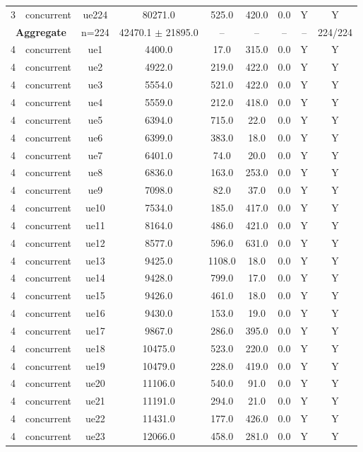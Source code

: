 \begin{table}[ht]
\begin{tabular}{|c|c|c|c|c|c|c|c|c|}
3 & concurrent & ue224 & 80271.0 & 525.0 & 420.0 & 0.0 & Y & Y \\
\multicolumn{2}{|c|}{\textbf{Aggregate}} & n=224 & 42470.1 $\pm$ 21895.0 & -- & -- & -- & -- & 224/224 \\
\hline
4 & concurrent & ue1 & 4400.0 & 17.0 & 315.0 & 0.0 & Y & Y \\
4 & concurrent & ue2 & 4922.0 & 219.0 & 422.0 & 0.0 & Y & Y \\
4 & concurrent & ue3 & 5554.0 & 521.0 & 422.0 & 0.0 & Y & Y \\
4 & concurrent & ue4 & 5559.0 & 212.0 & 418.0 & 0.0 & Y & Y \\
4 & concurrent & ue5 & 6394.0 & 715.0 & 22.0 & 0.0 & Y & Y \\
4 & concurrent & ue6 & 6399.0 & 383.0 & 18.0 & 0.0 & Y & Y \\
4 & concurrent & ue7 & 6401.0 & 74.0 & 20.0 & 0.0 & Y & Y \\
4 & concurrent & ue8 & 6836.0 & 163.0 & 253.0 & 0.0 & Y & Y \\
4 & concurrent & ue9 & 7098.0 & 82.0 & 37.0 & 0.0 & Y & Y \\
4 & concurrent & ue10 & 7534.0 & 185.0 & 417.0 & 0.0 & Y & Y \\
4 & concurrent & ue11 & 8164.0 & 486.0 & 421.0 & 0.0 & Y & Y \\
4 & concurrent & ue12 & 8577.0 & 596.0 & 631.0 & 0.0 & Y & Y \\
4 & concurrent & ue13 & 9425.0 & 1108.0 & 18.0 & 0.0 & Y & Y \\
4 & concurrent & ue14 & 9428.0 & 799.0 & 17.0 & 0.0 & Y & Y \\
4 & concurrent & ue15 & 9426.0 & 461.0 & 18.0 & 0.0 & Y & Y \\
4 & concurrent & ue16 & 9430.0 & 153.0 & 19.0 & 0.0 & Y & Y \\
4 & concurrent & ue17 & 9867.0 & 286.0 & 395.0 & 0.0 & Y & Y \\
4 & concurrent & ue18 & 10475.0 & 523.0 & 220.0 & 0.0 & Y & Y \\
4 & concurrent & ue19 & 10479.0 & 228.0 & 419.0 & 0.0 & Y & Y \\
4 & concurrent & ue20 & 11106.0 & 540.0 & 91.0 & 0.0 & Y & Y \\
4 & concurrent & ue21 & 11191.0 & 294.0 & 21.0 & 0.0 & Y & Y \\
4 & concurrent & ue22 & 11431.0 & 177.0 & 426.0 & 0.0 & Y & Y \\
4 & concurrent & ue23 & 12066.0 & 458.0 & 281.0 & 0.0 & Y & Y \\

\end{tabular}
\end{table}

